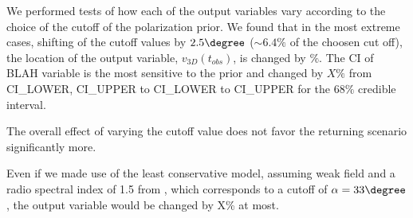 We performed tests of how each of the output variables vary according to the
choice of the cutoff of the polarization prior.
We found that in the most extreme cases, shifting of the cutoff values by
$2.5\degree$ ($\sim 6.4\%$ of the choosen cut off), the location of the output
variable, $v_{3D}(t_{obs})$, is changed by $\%$. The CI of BLAH variable is
the most sensitive to the prior and changed by $X\%$ from CI_LOWER, CI_UPPER to
CI_LOWER to CI_UPPER for the $68\%$ credible interval. 

The overall effect of varying the cutoff value does not favor the
returning scenario significantly more. 

Even if we made use of the least conservative model, assuming weak field
and a radio spectral index of 1.5 from \cite{E98}, which
corresponds to a cutoff of $\alpha = 33\degree$, the output variable would
be changed by X\% at most. 





